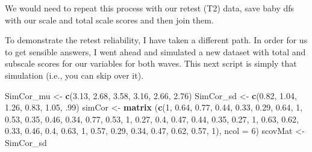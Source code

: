\documentclass[
  english,
]{book}
\newenvironment{Shaded}{\begin{snugshade}}{\end{snugshade}}
\newcommand{\DataTypeTok}[1]{\textcolor[rgb]{0.13,0.29,0.53}{#1}}
\newcommand{\DecValTok}[1]{\textcolor[rgb]{0.00,0.00,0.81}{#1}}
\newcommand{\FloatTok}[1]{\textcolor[rgb]{0.00,0.00,0.81}{#1}}
\newcommand{\KeywordTok}[1]{\textcolor[rgb]{0.13,0.29,0.53}{\textbf{#1}}}
\newcommand{\NormalTok}[1]{#1}
\newcommand{\OperatorTok}[1]{\textcolor[rgb]{0.81,0.36,0.00}{\textbf{#1}}}
\newcommand{\StringTok}[1]{\textcolor[rgb]{0.31,0.60,0.02}{#1}}
\begin{document}
We would need to repeat this process with our retest (T2) data, save baby dfs with our scale and total scale scores and then join them.

To demonstrate the retest reliability, I have taken a different path. In order for us to get sensible answers, I went ahead and simulated a new dataset with total and subscale scores for our variables for both waves. This next script is simply that simulation (i.e., you can skip over it).

\begin{Shaded}
\begin{Highlighting}[]
\NormalTok{SimCor_mu <-}\StringTok{ }\KeywordTok{c}\NormalTok{(}\FloatTok{3.13}\NormalTok{, }\FloatTok{2.68}\NormalTok{, }\FloatTok{3.58}\NormalTok{, }\FloatTok{3.16}\NormalTok{, }\FloatTok{2.66}\NormalTok{, }\FloatTok{2.76}\NormalTok{)}
\NormalTok{SimCor_sd <-}\StringTok{ }\KeywordTok{c}\NormalTok{(}\FloatTok{0.82}\NormalTok{, }\FloatTok{1.04}\NormalTok{, }\FloatTok{1.26}\NormalTok{, }\FloatTok{0.83}\NormalTok{, }\FloatTok{1.05}\NormalTok{, }\FloatTok{.99}\NormalTok{)}
\NormalTok{simCor <-}\StringTok{ }\KeywordTok{matrix}\NormalTok{ (}\KeywordTok{c}\NormalTok{(}\DecValTok{1}\NormalTok{,  }\FloatTok{0.64}\NormalTok{,   }\FloatTok{0.77}\NormalTok{,   }\FloatTok{0.44}\NormalTok{,   }\FloatTok{0.33}\NormalTok{,   }\FloatTok{0.29}\NormalTok{,}
                    \FloatTok{0.64}\NormalTok{,   }\DecValTok{1}\NormalTok{,  }\FloatTok{0.53}\NormalTok{,   }\FloatTok{0.35}\NormalTok{,   }\FloatTok{0.46}\NormalTok{,   }\FloatTok{0.34}\NormalTok{,}
                    \FloatTok{0.77}\NormalTok{,   }\FloatTok{0.53}\NormalTok{,   }\DecValTok{1}\NormalTok{,  }\FloatTok{0.27}\NormalTok{,   }\FloatTok{0.4}\NormalTok{,    }\FloatTok{0.47}\NormalTok{,}
                    \FloatTok{0.44}\NormalTok{,   }\FloatTok{0.35}\NormalTok{,   }\FloatTok{0.27}\NormalTok{,   }\DecValTok{1}\NormalTok{,  }\FloatTok{0.63}\NormalTok{,   }\FloatTok{0.62}\NormalTok{,}
                    \FloatTok{0.33}\NormalTok{,   }\FloatTok{0.46}\NormalTok{,   }\FloatTok{0.4}\NormalTok{,    }\FloatTok{0.63}\NormalTok{,   }\DecValTok{1}\NormalTok{,  }\FloatTok{0.57}\NormalTok{,}
                    \FloatTok{0.29}\NormalTok{,   }\FloatTok{0.34}\NormalTok{,   }\FloatTok{0.47}\NormalTok{,   }\FloatTok{0.62}\NormalTok{,   }\FloatTok{0.57}\NormalTok{,   }\DecValTok{1}\NormalTok{),}
                  \DataTypeTok{ncol =} \DecValTok{6}\NormalTok{)}
\NormalTok{scovMat <-}\StringTok{ }\NormalTok{SimCor_sd }\OperatorTok{%
}
\end{Highlighting}
\end{Shaded}
\end{document}
